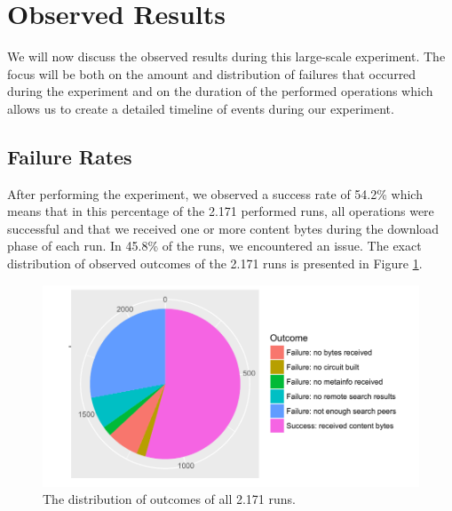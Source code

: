 \section{Observed Results}
We will now discuss the observed results during this large-scale experiment. The focus will be both on the amount and distribution of failures that occurred during the experiment and on the duration of the performed operations which allows us to create a detailed timeline of events during our experiment.

\subsection{Failure Rates}
After performing the experiment, we observed a success rate of 54.2\% which means that in this percentage of the 2.171 performed runs, all operations were successful and that we received one or more content bytes during the download phase of each run. In 45.8\% of the runs, we encountered an issue. The exact distribution of observed outcomes of the 2.171 runs is presented in Figure \ref{fig:big-experiment-outcome-pie}.

\begin{figure}[!h]
	\centering
	\includegraphics[width=0.85\columnwidth]{images/big_experiment/outcome_pie}
	\caption{The distribution of outcomes of all 2.171 runs.}
	\label{fig:big-experiment-outcome-pie}
\end{figure}

